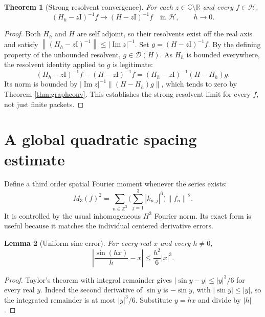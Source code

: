 \documentclass[11pt,oneside]{article}
\theoremstyle{kol}
\newtheorem{theorem}{Theorem}[section]
\newtheorem{lemma}[theorem]{Lemma}
\theoremstyle{definition}
\newcommand{\Hu}{\mathcal H}
\newcommand{\Dn}{\mathcal D}
\newcommand{\C}{\mathbb C}
\newcommand{\R}{\mathbb R}
\newcommand{\Z}{\mathbb Z}
\newcommand{\Id}{\mathrm I}
\newcommand{\pp}[1]{\left\lVert#1\right\rVert}
\begin{document}
\begin{theorem}[Strong resolvent convergence]\label{thm:resolvent}
For each $z\in\C\setminus\R$ and every $f\in\Hu$,
\begin{equation}\label{eq:res}
(H_h-z\Id)^{-1}f\longrightarrow(H-z\Id)^{-1}f
\quad\text{in }\Hu,\qquad h\to0.
\end{equation}
\end{theorem}
\begin{proof}
Both $H_h$ and $H$ are self adjoint, so their resolvents exist off the real axis and satisfy
$\pp{(H_h-z\Id)^{-1}}\le |\operatorname{Im}z|^{-1}$. Set $g=(H-z\Id)^{-1}f$. By the defining property of the unbounded resolvent, $g\in\Dn(H)$. As $H_h$ is bounded everywhere, the resolvent identity applied to $g$ is legitimate:
\[
(H_h-z\Id)^{-1}f-(H-z\Id)^{-1}f
=(H_h-z\Id)^{-1}(H-H_h)g.
\]
Its norm is bounded by $|\operatorname{Im}z|^{-1}\pp{(H-H_h)g}$, which tends to zero by Theorem \ref{thm:graphconv}. This establishes the strong resolvent limit for every $f$, not just finite packets.
\end{proof}

\section{A global quadratic spacing estimate}
Define a third order spatial Fourier moment whenever the series exists:
\begin{equation}\label{eq:weight3}
M_3(f)^2=\sum_{n\in\Z^3}\bigg(\sum_{j=1}^3|k_{n,j}|^6\bigg)\pp{f_n}^2.
\end{equation}
It is controlled by the usual inhomogeneous $H^3$ Fourier norm. Its exact form is useful because it matches the individual centered derivative errors.

\begin{lemma}[Uniform sine error]\label{lem:sine}
For every real $x$ and every $h\ne0$,
\begin{equation}\label{eq:sinerr}
\left|\frac{\sin(hx)}h-x\right|\le\frac{h^2}{6}|x|^3.
\end{equation}
\end{lemma}
\begin{proof}
Taylor's theorem with integral remainder gives $|\sin y-y|\le |y|^3/6$ for every real $y$. Indeed the second derivative of $\sin y$ is $-\sin y$, with $|\sin y|\le|y|$, so the integrated remainder is at most $|y|^3/6$. Substitute $y=hx$ and divide by $|h|$.
\end{proof}
\end{document}
